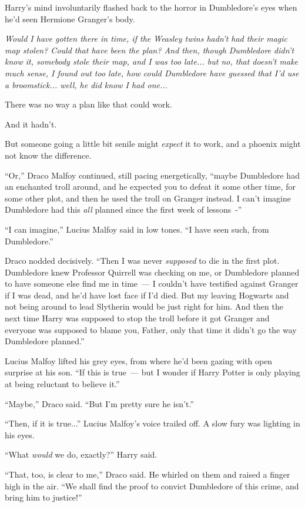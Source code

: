 Harry's mind involuntarily flashed back to the horror in Dumbledore's eyes when he'd seen Hermione Granger's body.

\emph{Would I have gotten there in time, if the Weasley twins hadn't had their magic map stolen? Could that have been the plan? And then, though Dumbledore didn't know it, somebody stole their map, and I was too late... but no, that doesn't make much sense, I found out too late, how could Dumbledore have guessed that I'd use a broomstick... well, he did know I had one...}

There was no way a plan like that could work.

And it hadn't.

But someone going a little bit senile might \emph{expect} it to work, and a phoenix might not know the difference.

``Or,'' Draco Malfoy continued, still pacing energetically, ``maybe Dumbledore had an enchanted troll around, and he expected you to defeat it some other time, for some other plot, and then he used the troll on Granger instead. I can't imagine Dumbledore had this \emph{all} planned since the first week of lessons~-''

``I can imagine,'' Lucius Malfoy said in low tones. ``I have seen such, from Dumbledore.''

Draco nodded decisively. ``Then I was never \emph{supposed} to die in the first plot. Dumbledore knew Professor Quirrell was checking on me, or Dumbledore planned to have someone else find me in time~--- I couldn't have testified against Granger if I was dead, and he'd have lost face if I'd died. But my leaving Hogwarts and not being around to lead Slytherin would be just right for him. And then the next time Harry was supposed to stop the troll before it got Granger and everyone was supposed to blame you, Father, only that time it didn't go the way Dumbledore planned.''

Lucius Malfoy lifted his grey eyes, from where he'd been gazing with open surprise at his son. ``If this is true~--- but I wonder if Harry Potter is only playing at being reluctant to believe it.''

``Maybe,'' Draco said. ``But I'm pretty sure he isn't.''

``Then, if it is true...'' Lucius Malfoy's voice trailed off. A slow fury was lighting in his eyes.

``What \emph{would} we do, exactly?'' Harry said.

``That, too, is clear to me,'' Draco said. He whirled on them and raised a finger high in the air. ``We shall find the proof to convict Dumbledore of this crime, and bring him to justice!''

